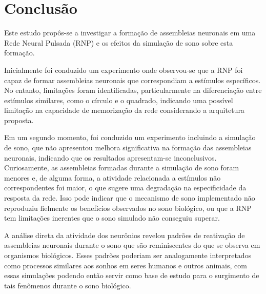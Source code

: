 \chapter{Conclusão}\label{cap_conclusao}

Este estudo propôs-se a investigar a formação de assembleias neuronais em uma Rede Neural Pulsada (RNP) e os efeitos da simulação
de sono sobre esta formação.

Inicialmente foi conduzido um experimento onde observou-se que a RNP foi capaz de formar assembleias neuronais que correspondiam a
estímulos específicos. No entanto, limitações foram identificadas, particularmente na diferenciação entre estímulos similares,
como o círculo e o quadrado, indicando uma possível limitação na capacidade de memorização da rede considerando a arquitetura
proposta.

Em um segundo momento, foi conduzido um experimento incluindo a simulação de sono, que não apresentou melhora significativa na
formação das assembleias neuronais, indicando que os resultados apresentam-se inconclusivos. Curiosamente, as assembleias formadas
durante a simulação de sono foram menores e, de alguma forma, a atividade relacionada a estímulos não correspondentes foi maior, o
que sugere uma degradação na especificidade da resposta da rede. Isso pode indicar que o mecanismo de sono implementado não
reproduziu fielmente os benefícios observados no sono biológico, ou que a RNP tem limitações inerentes que o sono simulado não
conseguiu superar.

A análise direta da atividade dos neurônios revelou padrões de reativação de assembleias neuronais durante o sono que são
reminiscentes do que se observa em organismos biológicos. Esses padrões poderiam ser analogamente interpretados como processos
similares aos sonhos em seres humanos e outros animais, com essas simulações podendo então servir como base de estudo para o
surgimento de tais fenômenos durante o sono biológico.

